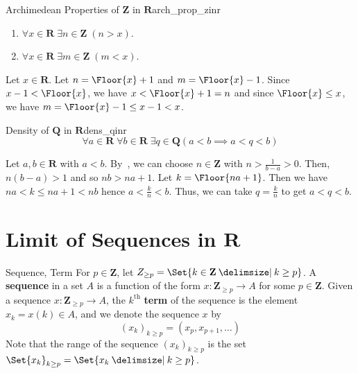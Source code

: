 \begin{Theorem}{Archimedean Properties of $ \mathbf{Z} $ in $ \mathbf{R} $}{arch_prop_zinr}
    \begin{enumerate}[label=(\arabic*)]
        \item\label{arch_prop_zinr_1} $ \forall x\in\mathbf{R}\;\exists n\in\mathbf{Z}\;(n>x) $.
        \item\label{arch_prop_zinr_2} $ \forall x\in\mathbf{R}\;\exists m\in\mathbf{Z}\;(m<x) $.
    \end{enumerate}
\end{Theorem}
\begin{Proof}{}{}
    Let $ x\in\mathbf{R} $. Let $ n=\Floor{x}+1 $ and $ m=\Floor{x}-1 $.
    Since $ x-1<\Floor{x} $, we have $ x<\Floor{x}+1=n $ and since
    $ \Floor{x}\le x $, we have $ m=\Floor{x}-1\le x-1<x $.
\end{Proof}
\begin{Theorem}{Density of $ \mathbf{Q} $ in $ \mathbf{R} $}{dens_qinr}
    \[ \forall a\in\mathbf{R}\;\forall b\in\mathbf{R}\;\exists q\in\mathbf{Q}
        (a<b\implies a<q<b) \]
\end{Theorem}
\begin{Proof}{}{}
    Let $ a,b\in\mathbf{R} $ with $ a<b $. By~,
    we can choose $ n\in\mathbf{Z} $ with $ n>\frac{1}{b-a} >0 $. Then,
    $ n(b-a)>1 $ and so $ nb>na+1 $. Let $ k=\Floor{na+1} $.
    Then we have $ na<k\le na+1<nb $ hence $ a<\frac{k}{n} <b $. Thus,
    we can take $ q=\frac{k}{n} $ to get $ a<q<b $.
\end{Proof}

\section{Limit of Sequences in \texorpdfstring{$ \mathbf{R} $}{R}}
\begin{Definition}{Sequence, Term}{}
    For $ p\in\mathbf{Z} $, let $ Z_{\ge p}=\Set{k\in\mathbf{Z}\given k\ge p} $.
    A \textbf{sequence} in a set $ A $ is a function of the form
    $ x:\mathbf{Z}_{\ge p}\to A $ for some $ p\in\mathbf{Z} $.
    Given a sequence $ x:\mathbf{Z}_{\ge p}\to A $, the $ k^{\text{th}} $
    \textbf{term} of the sequence is the element $ x_k=x(k)\in A $, and
    we denote the sequence $ x $ by
    \[ (x_k)_{k\ge p}=(x_p,x_{p+1},\ldots) \]
    Note that the range of the sequence $ (x_k)_{k\ge p} $
    is the set $ \Set{x_k}_{k\ge p}=\Set{x_k\given k\ge p} $.
\end{Definition}
